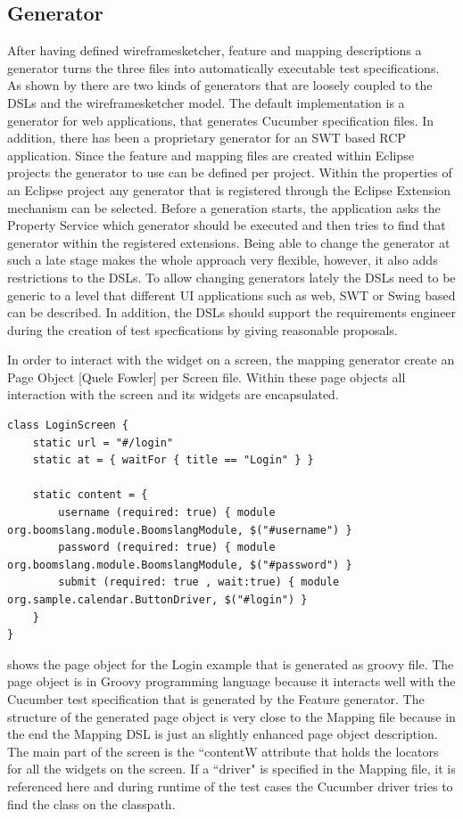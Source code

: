 \documentclass{sig-alternate-05-2015}
\begin{document}
{\subsection{Generator}\label{sec:Generator} 
After having defined wireframesketcher, feature and mapping descriptions a generator turns the three files into automatically executable test specifications.
As shown by  there are two kinds of generators that are loosely coupled to the DSLs and the wireframesketcher model.
The default implementation is a generator for web applications, that generates Cucumber specification files.
In addition, there has been a proprietary generator for an SWT based RCP application.
Since the feature and mapping files are created within Eclipse projects the generator to use can be defined per project.
Within the properties of an Eclipse project any generator that is registered through the Eclipse Extension mechanism can be selected.
Before a generation starts, the application asks the Property Service which generator should be executed and then tries to find that generator within the registered extensions.
Being able to change the generator at such a late stage makes the whole approach very flexible, however, it also adds restrictions to the DSLs.
To allow changing generators lately the DSLs need to be generic to a level that different UI applications such as web, SWT or Swing based can be described.
In addition, the DSLs should support the requirements engineer during the creation of test specfications by giving reasonable proposals.

In order to interact with the widget on a screen, the mapping generator create an Page Object [Quele Fowler] per Screen file.
Within these page objects all interaction with the screen and its widgets are encapsulated.

\begin{lstlisting}[captionpos=b, caption=Generated Page Object, label={lst:MappingGenerated}, language=dsl]
class LoginScreen {
	static url = "#/login"
	static at = { waitFor { title == "Login" } }
	
	static content = {
		username (required: true) { module org.boomslang.module.BoomslangModule, $("#username") }
		password (required: true) { module org.boomslang.module.BoomslangModule, $("#password") }
		submit (required: true , wait:true) { module org.sample.calendar.ButtonDriver, $("#login") }
	}
}
\end{lstlisting}

 shows the page object for the Login example that is generated as groovy file.
The page object is in Groovy programming language because it interacts well with the Cucumber test specification that is generated by the Feature generator.
The structure of the generated page object is very close to the Mapping file because in the end the Mapping DSL is just an slightly enhanced page object description.
The main part of the screen is the ``contentW attribute that holds the locators for all the widgets on the screen.
If a ``driver" is specified in the Mapping file, it is referenced here and during runtime of the test cases the Cucumber driver tries to find the class on the classpath.

}
\end{document}

